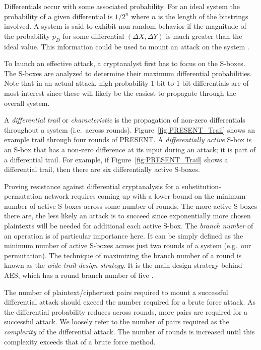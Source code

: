Differentials occur with some associated probability.
For an ideal system the probability of a given differential is $1/2^n$ where $n$ is the length of the bitstrings involved.
A system is said to exhibit non-random behavior if the magnitude of the probability $p_D$ for some differential $(\Delta X, \Delta Y)$ is much greater than the ideal value.
This information could be used to mount an attack on the system \cite{Heys2002_Tutorial}.

To launch an effective attack, a cryptanalyst first has to focus on the S-boxes.
The S-boxes are analyzed to determine their maximum differential probabilities.
Note that in an actual attack, high probability $1$-bit-to-$1$-bit differentials are of most interest since these will likely be the easiest to propagate through the overall system.

A \emph{differential trail} or \emph{characteristic} is the propagation of non-zero differentials throughout a system (i.e.\ across rounds).
Figure~\ref{fig:PRESENT_Trail} shows an example trail through four rounds of PRESENT.
A \emph{differentially active} S-box is an S-box that has a non-zero difference at its input during an attack; it is part of a differential trail.
For example, if Figure~\ref{fig:PRESENT_Trail} shows a differential trail, then there are six differentially active S-boxes.

Proving resistance against differential cryptanalysis for a substitution-permutation network requires coming up with a lower bound on the minimum number of active S-boxes across some number of rounds.
The more active S-boxes there are, the less likely an attack is to succeed since exponentially more chosen plaintexts will be needed for additional each active S-box.
The \emph{branch number} of an operation is of particular importance here. 
It can be simply defined as the minimum number of active S-boxes across just two rounds of a system (e.g.\ our permutation).
The technique of maximizing the branch number of a round is known as the \emph{wide trail design strategy}.
It is the main design strategy behind AES, which has a round branch number of five \cite{Daemen2001_WideTrail}\cite{Daemen2002_DesignOfRijndael}.

The number of plaintext/ciphertext pairs required to mount a successful differential attack should exceed the number required for a brute force attack.
As the differential probability reduces across rounds, more pairs are required for a successful attack.
We loosely refer to the number of pairs required as the \emph{complexity} of the differential attack.
The number of rounds is increased until this complexity exceeds that of a brute force method.

